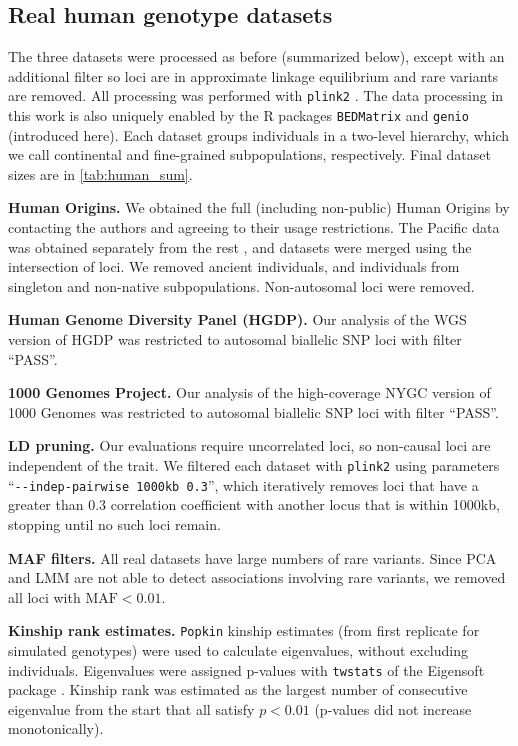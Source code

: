 \documentclass[11pt]{article}
\begin{document}
\subsection{Real human genotype datasets}

The three datasets were processed as before \citep{ochoa_human} (summarized below), except with an additional filter so loci are in approximate linkage equilibrium and rare variants are removed.
All processing was performed with \texttt{plink2} \citep{chang_second-generation_2015}.
The data processing in this work is also uniquely enabled by the R packages \texttt{BEDMatrix} \citep{grueneberg_bgdata_2019} and \texttt{genio} (introduced here).
Each dataset groups individuals in a two-level hierarchy, which we call continental and fine-grained subpopulations, respectively.
Final dataset sizes are in \cref{tab:human_sum}.

\textbf{Human Origins.}
We obtained the full (including non-public) Human Origins by contacting the authors and agreeing to their usage restrictions.
The Pacific data \citep{skoglund_genomic_2016} was obtained separately from the rest \citep{lazaridis_ancient_2014,lazaridis_genomic_2016}, and datasets were merged using the intersection of loci.
We removed ancient individuals, and individuals from singleton and non-native subpopulations.
Non-autosomal loci were removed.

\textbf{Human Genome Diversity Panel (HGDP).}
Our analysis of the WGS version of HGDP \citep{bergstrom_insights_2020} was restricted to autosomal biallelic SNP loci with filter ``PASS''.

\textbf{1000 Genomes Project.}
Our analysis of the high-coverage NYGC version of 1000 Genomes \citep{fairley_international_2020} was restricted to autosomal biallelic SNP loci with filter ``PASS''.

\textbf{LD pruning.}
Our evaluations require uncorrelated loci, so non-causal loci are independent of the trait.
We filtered each dataset with \texttt{plink2} using parameters ``\texttt{-{}-indep-pairwise 1000kb 0.3}'', which iteratively removes loci that have a greater than 0.3 correlation coefficient with another locus that is within 1000kb, stopping until no such loci remain.

\textbf{MAF filters.}
All real datasets have large numbers of rare variants.
Since PCA and LMM are not able to detect associations involving rare variants, we removed all loci with $\text{MAF} < 0.01$.

\textbf{Kinship rank estimates.}
\texttt{Popkin} kinship estimates (from first replicate for simulated genotypes) were used to calculate eigenvalues, without excluding individuals.
Eigenvalues were assigned p-values with \texttt{twstats} of the Eigensoft package \citep{patterson_population_2006}.
Kinship rank was estimated as the largest number of consecutive eigenvalue from the start that all satisfy $p < 0.01$ (p-values did not increase monotonically).
\end{document}
